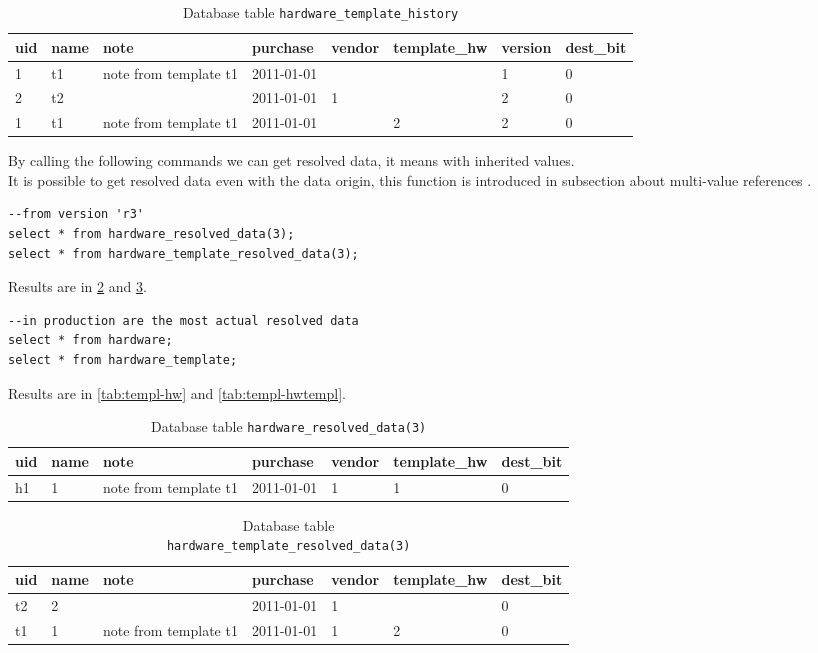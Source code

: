 \documentclass[deska]{subfiles}
\begin{document}
\begin{longtable}{ l | l | l | l | l | l | l | l }
    \caption{Database table {\tt hardware\_template\_history}}\\
    uid & name & note & purchase & vendor & template\_hw & version & dest\_bit\\
    \hline
    \endhead
\label{tab:templ-hwtemplhist}
    1 & t1 & note from template t1 & 2011-01-01 &  &  & 1 & 0\\
    2 & t2 &  & 2011-01-01 & 1 &  & 2 & 0\\
    1 & t1 & note from template t1 & 2011-01-01 &  & 2 & 2 & 0\\
    \hline
\end{longtable}


By calling the following commands we can get resolved data, it means with inherited values.\\
It is possible to get resolved data even with the data origin, this function is introduced in subsection about multi-value references .
\begin{verbatim}
--from version 'r3'
select * from hardware_resolved_data(3);
select * from hardware_template_resolved_data(3);
\end{verbatim}

Results are in \ref{tab:templ-hwres2} and \ref{tab:templ-hwtemplres2}.

\begin{verbatim}
--in production are the most actual resolved data
select * from hardware;
select * from hardware_template;
\end{verbatim}
Results are in \ref{tab:templ-hw} and \ref{tab:templ-hwtempl}.

\begin{longtable}{ l | l | l | l | l | l | l }
    \caption{Database table {\tt hardware\_resolved\_data(3)}}\\
    uid & name & note & purchase & vendor & template\_hw & dest\_bit\\
    \hline
    \endhead
\label{tab:templ-hwres2}
    h1 & 1 & note from template t1 & 2011-01-01 & 1 & 1 & 0\\
    \hline
\end{longtable}

\begin{longtable}{ l | l | l | l | l | l | l }
    \caption{Database table \\ {\tt hardware\_template\_resolved\_data(3)}}\\
    uid & name & note & purchase & vendor & template\_hw & dest\_bit\\
    \hline
    \endhead
\label{tab:templ-hwtemplres2}
    t2 & 2 &  & 2011-01-01 & 1 &  & 0\\
    t1 & 1 & note from template t1 & 2011-01-01 & 1 & 2 & 0\\
    \hline
\end{longtable}
\end{document}
